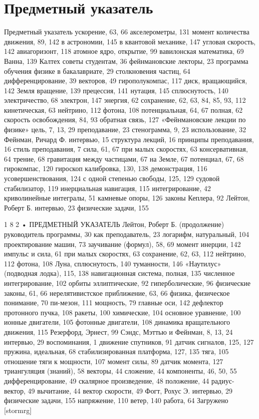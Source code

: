 \documentclass[10pt,oneside]{article}
\begin{document}
\section*{Предметный указатель}
\label{tips-sec-15-предметный-указатель}
Предметный указатель ускорение, 63, 66 акселерометры, 131 момент количества движения, 89, 142 в астрономии, 145 в квантовой механике, 147 угловая скорость, 142 авиагоризонт, 118 атомное ядро, открытие, 99 вавилонская математика, 69 Ванна, 139 Калтех советы студентам, 36 фейнмановские лекторы, 23 программа обучения физике в бакалавриате, 29 столкновения частиц, 64 дифференцирование, 39 векторов, 49 гирополукомпас, 117 диск, вращающийся, 142 Земля вращение, 139 прецессия, 141 нутация, 145 сплюснутость, 140 электричество, 68 электрон, 147 энергия, 62 сохранение, 62, 63, 84, 85, 93, 112 кинетическая, 63 нейтрино, 112 фотона, 108 потенциальная, 64, 67 полная, 62 скорость освобождения, 84, 93 обратная связь, 127 «Фейнмановские лекции по физике» цель, 7, 13, 29 преподавание, 23 стенограмма, 9, 23 использование, 32 Фейнман, Ричард Ф. интервью, 15 структура лекций, 16 принципы преподавания, 16 стиль преподавания, 7 сила, 61, 67 при малых скоростях, 63 консервативная, 64 трение, 68 гравитация между частицами, 67 на Земле, 67 потенциал, 67, 68 гирокомпас, 120 гироскоп калибровка, 130, 138 демонстрация, 116 усовершенствования, 124 с одной степенью свободы, 125, 129 судовой стабилизатор, 119 инерциальная навигация, 115 интегрирование, 42 криволинейные интегралы, 51 камневые опоры, 126 законы Кеплера, 92 Лейтон, Роберт Б. интервью, 23 физические задачи, 155\par

1 8 2 • ПРЕДМЕТНЫЙ УКАЗАТЕЛЬ Лейтон, Роберт Б. (продолжение) руководитель программы, 30 как преподаватель, 23 логарифм, натуральный, 104 проектирование машин, 73 заучивание (формул), 58, 69 момент инерции, 142 импульс и сила, 61 при малых скоростях, 63 сохранение, 62, 63, 112 нейтрино, 112 фотона, 108 Луна, сплюснутость, 140 туманности, 146 «Наутилус» (подводная лодка), 115, 138 навигационная система, полная, 135 численное интегрирование, 102 орбиты эллиптические, 92 гиперболические, 96 физические законы, 61, 66 нерелятивистское приближение, 63, 66 физика, физическое понимание, 70 пи-мезон, 111 мощность, 79 главные оси, 142 дефлектор протонного пучка, 108 ракеты, 100 химические, 104 основное уравнение, 100 ионные двигатели, 105 фотонные двигатели, 108 динамика вращательного движения, 115 Резерфорд, Эрнест, 99 Сэндс, Мэттью и Фейнман, 8, 13, 24 интервью, 29 воспоминания, 1 движение спутников, 91 датчик сигналов, 125, 127 пружина, идеальная, 68 стабилизированная платформа, 127, 135 тяга, 105 отношение тяги к мощности, 107 момент силы, 89 датчик момента, 127 триангуляция (знаний), 58 векторы, 44 сложение, 44 компоненты, 46, 50, 55 дифференцирование, 49 скалярное произведение, 48 положение, 44 радиус-вектор, 49 вычитание, 44 вектор скорости, 49 Фогт, Рохус Э. интервью, 29 физические задачи, 155 напряжение, 110 ветер, 140 работа, 64 Загружено [stormrg]\par
\end{document}
